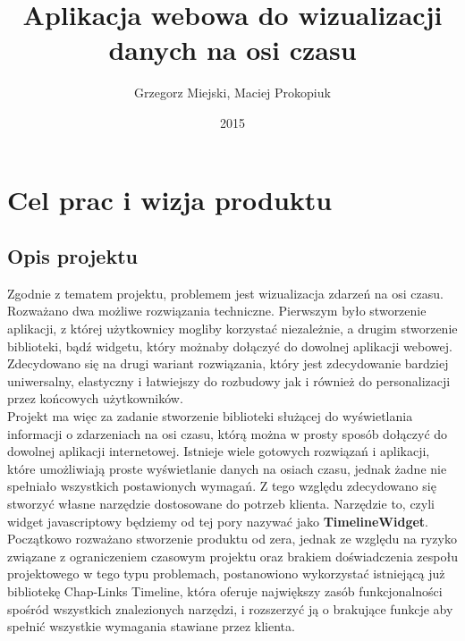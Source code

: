 \documentclass[polish,12pt]{aghthesis}
\author{Grzegorz Miejski, Maciej Prokopiuk}
\title{Aplikacja webowa do wizualizacji danych na osi czasu}
\date{2015}
\begin{document}
\maketitle



\section{Cel prac i wizja produktu}
\label{sec:cel-wizja}

\subsection{Opis projektu}
Zgodnie z tematem projektu, problemem jest wizualizacja zdarzeń na osi czasu. Rozważano dwa możliwe rozwiązania techniczne. Pierwszym było stworzenie aplikacji, z której użytkownicy mogliby korzystać niezależnie, a drugim stworzenie biblioteki, bądź widgetu, który możnaby dołączyć do dowolnej aplikacji webowej. 
\\

	Zdecydowano się na drugi wariant rozwiązania, który jest zdecydowanie bardziej uniwersalny, elastyczny i łatwiejszy do rozbudowy jak i również do personalizacji przez końcowych użytkowników. 
\\

	Projekt ma więc za zadanie stworzenie biblioteki służącej do wyświetlania informacji o zdarzeniach na osi czasu, którą można w prosty sposób dołączyć do dowolnej aplikacji internetowej. Istnieje wiele gotowych rozwiązań i aplikacji, które umożliwiają proste wyświetlanie danych na osiach czasu, jednak żadne nie spełniało wszystkich postawionych wymagań. Z tego względu zdecydowano się stworzyć własne narzędzie dostosowane do potrzeb klienta. Narzędzie to, czyli widget javascriptowy będziemy od tej pory nazywać jako \textbf{TimelineWidget}. 
\\

Początkowo rozważano stworzenie produktu od zera, jednak ze względu na ryzyko związane z ograniczeniem czasowym projektu oraz brakiem doświadczenia zespołu projektowego w tego typu problemach, postanowiono wykorzystać istniejącą już bibliotekę Chap-Links Timeline, która oferuje największy zasób funkcjonalności spośród wszystkich znalezionych narzędzi, i rozszerzyć ją o brakujące funkcje aby spełnić wszystkie wymagania stawiane przez klienta.
\\
\end{document}
